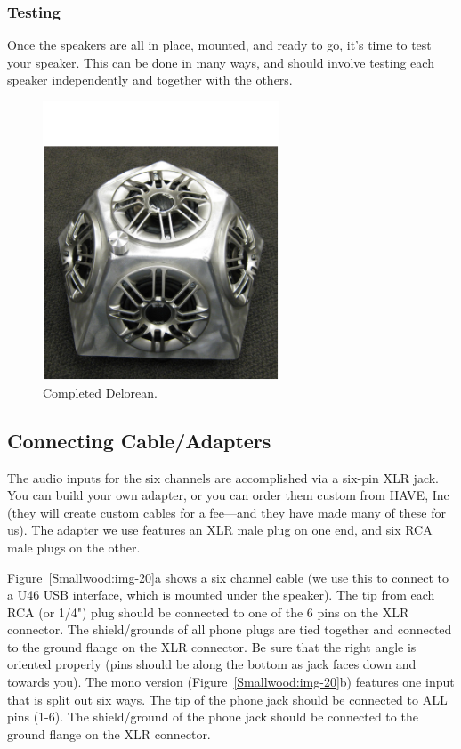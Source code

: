 \subsubsection{Testing}

Once the speakers are all in place, mounted, and ready to go, it's time to test
your speaker. This can be done in many ways, and should involve testing each
speaker independently and together with the others.

\begin{figure}[t]
\centering
\includegraphics[width=70mm]{img-19-eps-converted-to-crop.pdf}
\caption{Completed Delorean.}
\label{Smallwood:img-19}
\end{figure}

\subsection{Connecting Cable/Adapters}

The audio inputs for the six channels are accomplished via a six-pin XLR jack.
You can build your own adapter, or you can order them custom from HAVE, Inc (they
will create custom cables for a fee---and they have made many of these for us). 
The adapter we use features an XLR male plug on one end, and six RCA male plugs
on the other.

Figure~\ref{Smallwood:img-20}a shows a six channel cable (we use this to connect to a U46 USB
interface, which is mounted under the speaker).  The tip from each RCA (or 1/4")
plug should be connected to one of the 6 pins on the XLR connector.  The
shield/grounds of all phone plugs are tied together and connected to the ground
flange on the XLR connector. Be sure that the right angle is oriented properly
(pins should be along the bottom as jack faces down and towards you).  The mono
version (Figure~\ref{Smallwood:img-20}b) features one input that is split out six ways.  The tip of
the phone jack should be connected to ALL pins (1-6). The shield/ground of the
phone jack should be connected to the ground flange on the XLR connector.

